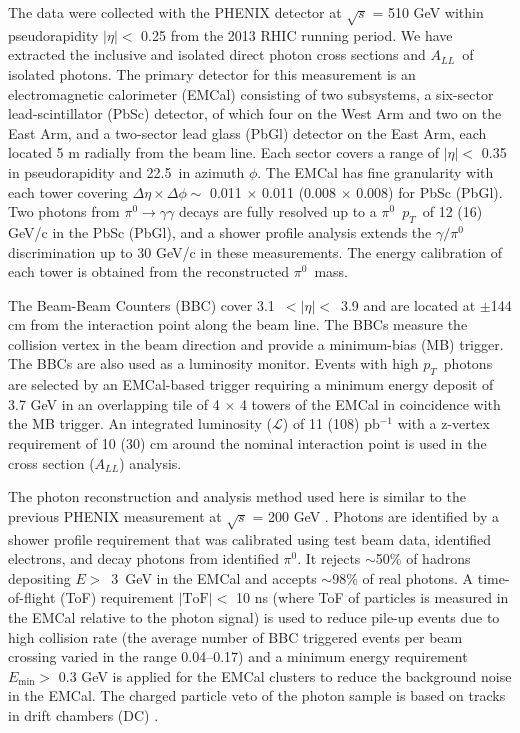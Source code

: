 \documentclass[twocolumn,letterpaper,aps,prl,longbibliography,superscriptaddress,floatfix]{revtex4-2}
\newcommand{\pT}{\ensuremath{p_T}}
\newcommand{\pizero}{\ensuremath{\pi^0}}
\newcommand{\ALL}{\ensuremath{A_{LL}}}
\begin{document}
The data were collected with the PHENIX detector \cite{ADCOX2003469} at $\sqrt{s}$ = 510 GeV within pseudorapidity $|\eta| <$ 0.25 from the 2013 RHIC running period. We have extracted the inclusive and isolated direct photon cross sections and \ALL\ of isolated photons. The primary detector for this measurement is an electromagnetic calorimeter (EMCal) \cite{APHECETCHE2003521} consisting of two subsystems, a six-sector lead-scintillator (PbSc) detector, of which four on the West Arm and two on the East Arm, and a two-sector lead glass (PbGl) detector on the East Arm, each located 5 m radially from the beam line. Each sector covers a range of  $|\eta| <$ 0.35 in pseudorapidity and 22.5\textdegree\ in azimuth $\phi$. The EMCal has fine granularity with each tower covering $\Delta\eta \times \Delta\phi \sim$ 0.011 $\times$ 0.011 (0.008 $\times$ 0.008) for PbSc (PbGl). Two photons from $\pi^0 \rightarrow \gamma\gamma$ decays are fully resolved up to a \pizero\ \pT\ of 12 (16) GeV/c in the PbSc (PbGl), and a shower profile analysis extends the $\gamma/\pi^0$ discrimination up to 30 GeV/c in these measurements. The energy calibration of each tower is obtained from the reconstructed \pizero\ mass.

The Beam-Beam Counters (BBC) \cite{ALLEN2003549} cover \mbox{3.1 $< |\eta| <$ 3.9} and are located at $\pm$144 cm from the interaction point along the beam line. The BBCs measure the collision vertex in the beam direction and provide a minimum-bias (MB) trigger. The BBCs are also used as a luminosity monitor. Events with high \pT\ photons are selected by an EMCal-based trigger requiring a minimum energy deposit of 3.7 GeV in an overlapping tile of 4 $\times$ 4 towers of the EMCal in coincidence with the MB trigger. An integrated luminosity ($\mathcal{L}$) of 11 (108) pb$^{-1}$ with a z-vertex requirement of 10 (30) cm around the nominal interaction point is used in the cross section (\ALL) analysis.
 
The photon reconstruction and analysis method used here is similar to the previous PHENIX measurement at $\sqrt{s}$ =  200 GeV \cite{PhysRevLett.98.012002, PhysRevD.86.072008}. Photons are identified by a shower profile requirement that was calibrated using test beam data, identified electrons, and decay photons from identified \pizero. It rejects $\sim$50\% of hadrons depositing \mbox{$E >$ 3 GeV} in the EMCal and accepts $\sim$98\% of real photons. A time-of-flight (ToF) requirement $|\text{ToF}| <$ 10 ns (where ToF of particles is measured in the EMCal relative to the photon signal) is used to reduce pile-up events due to high collision rate (the average number of BBC triggered events per beam crossing varied in the range 0.04--0.17) and a minimum energy requirement $E_{\text{min}} >$ 0.3 GeV is applied for the EMCal clusters to reduce the background noise in the EMCal. The charged particle veto of the photon sample is based on tracks in drift chambers (DC) \cite{ADCOX2003489}. 
\end{document}
